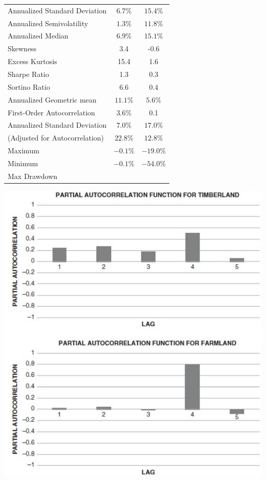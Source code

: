 \documentclass[11pt]{article}
\begin{document}
\begin{center}
\begin{tabular}{lcc}
Annualized Standard Deviation & $6.7 \%$ & $15.4 \%$ \\
Annualized Semivolatility & $1.3 \%$ & $11.8 \%$ \\
Annualized Median & $6.9 \%$ & $15.1 \%$ \\
Skewness & 3.4 & -0.6 \\
Excess Kurtosis & 15.4 & 1.6 \\
Sharpe Ratio & 1.3 & 0.3 \\
Sortino Ratio & 6.6 & 0.4 \\
Annualized Geometric mean & $11.1 \%$ & $5.6 \%$ \\
First-Order Autocorrelation & $3.6 \%$ & 0.1 \\
Annualized Standard Deviation & $7.0 \%$ & $17.0 \%$ \\
(Adjusted for Autocorrelation) & $22.8 \%$ & $12.8 \%$ \\
Maximum & $-0.1 \%$ & $-19.0 \%$ \\
Minimum & $-0.1 \%$ & $-54.0 \%$ \\
Max Drawdown &  &  \\
\hline
\end{tabular}
\end{center}

\begin{center}
\includegraphics[max width=\textwidth]{2024_04_10_b4591cb000ecad44f255g-3(1)}
\end{center}
\end{document}
